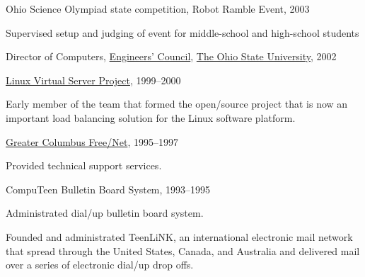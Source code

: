 \halfblankline

Ohio Science Olympiad state competition, Robot Ramble Event, 2003
%
\begin{innerlist}
    \item Supervised setup and judging of event for middle-school and
        high-school students
\end{innerlist}

\halfblankline

Director of Computers,
\href{http://ec.osu.edu/}{Engineers' Council},
\href{http://www.osu.edu/}{The Ohio State University}, 2002

\halfblankline

\href{http://www.linuxvirtualserver.org/}
     {Linux Virtual Server Project}, 1999--2000
\begin{innerlist}
\item Early member of the team that formed the open\-/source project that
        is now an important load balancing solution for the Linux
        software platform.
\end{innerlist}

\halfblankline

\href{http://www.gcfn.org/}
     {Greater Columbus Free\-/Net}, 1995--1997
\begin{innerlist}
\item Provided technical support services.
\end{innerlist}

\halfblankline

CompuTeen Bulletin Board System, 1993--1995
\begin{innerlist}
\item Administrated dial\-/up bulletin board system.
\item Founded and administrated TeenLiNK, an international electronic
        mail network that spread through the United States, Canada, and
        Australia and delivered mail over a series of electronic dial\-/up
        drop offs.
\end{innerlist}
